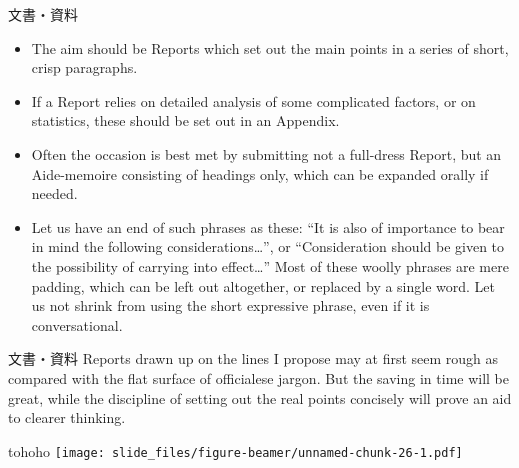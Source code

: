 \documentclass[
  ignorenonframetext,
]{beamer}
\providecommand{\tightlist}{%
  \setlength{\itemsep}{0pt}\setlength{\parskip}{0pt}}
\begin{document}
\begin{frame}{文書・資料}
\protect\hypertarget{ux6587ux66f8ux8cc7ux6599-1}{}
\begin{itemize}[<+->]
\tightlist
\item
  \textbullet{}\hspace{2pt} The aim should be Reports which set out the
  main points in a series of short, crisp paragraphs.
\item
  \textbullet{}\hspace{2pt} If a Report relies on detailed analysis of
  some complicated factors, or on statistics, these should be set out in
  an Appendix.
\item
  \textbullet{}\hspace{2pt} Often the occasion is best met by submitting
  not a full-dress Report, but an Aide-memoire consisting of headings
  only, which can be expanded orally if needed.
\item
  \textbullet\hspace{2pt}Let us have an end of such phrases as these:
  ``It is also of importance to bear in mind the following
  considerations\ldots{}'', or ``Consideration should be given to the
  possibility of carrying into effect\ldots{}'' Most of these woolly
  phrases are mere padding, which can be left out altogether, or
  replaced by a single word. Let us not shrink from using the short
  expressive phrase, even if it is conversational.
\end{itemize}
\end{frame}

\begin{frame}{文書・資料}
\protect\hypertarget{ux6587ux66f8ux8cc7ux6599-2}{}
Reports drawn up on the lines I propose may at first seem rough as
compared with the flat surface of officialese jargon. But the saving in
time will be great, while the discipline of setting out the real points
concisely will prove an aid to clearer thinking.
\end{frame}

\begin{frame}{tohoho}
\protect\hypertarget{tohoho}{}
\texttt{[image: slide\_files/figure-beamer/unnamed-chunk-26-1.pdf]}
\end{frame}
\end{document}
